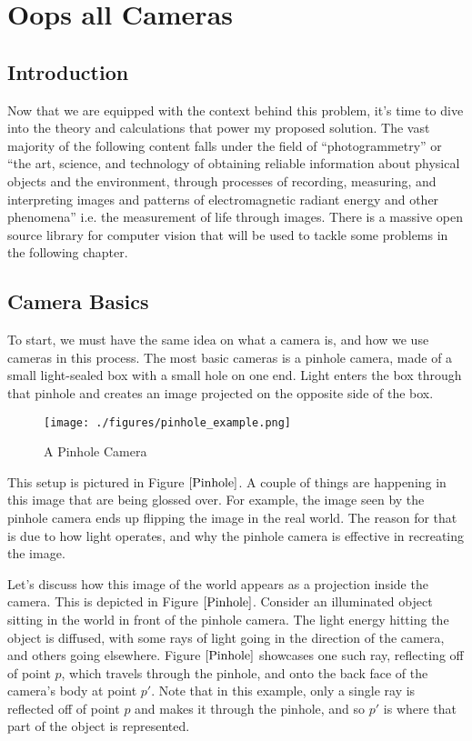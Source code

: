 \documentclass[
    12pt,
    twoside,
    bibstyle=chicago,
    headerstyle=uppercase,
	bibfile=thesis_updating.bib
]{reedthesis}
\begin{document}
\chapter{Oops all Cameras}


\section{Introduction}
	Now that we are equipped with the context behind this problem, it's time to dive into the theory and calculations that power my proposed solution. The vast majority of the following content falls under the field of “photogrammetry” or “the art, science, and technology of obtaining reliable information about physical objects and the environment, through processes of recording, measuring, and interpreting images and patterns of electromagnetic radiant energy and other phenomena” i.e. the measurement of life through images. There is a massive open source library for computer vision that will be used to tackle some problems in the following chapter. \autocite{pulliRealtimeComputerVision2012}
	
\section{Camera Basics}
To start, we must have the same idea on what a camera is, and how we use cameras in this process. The most basic cameras is a pinhole camera, made of a small light-sealed box with a small hole on one end. Light enters the box through that pinhole and creates an image projected on the opposite side of the box.

\begin{figure}[h]
	    \centering
	    \texttt{[image: ./figures/pinhole\_example.png]}
	    \caption{A Pinhole Camera}
	\label{Pinhole}
	\end{figure}

This setup is pictured in Figure $\ref{Pinhole}$. A couple of things are happening in this image that are being glossed over. For example, the image seen by the pinhole camera ends up flipping the image in the real world. The reason for that is due to how light operates, and why the pinhole camera is effective in recreating the image.

Let's discuss how this image of the world appears as a projection inside the camera. This is depicted in Figure $\ref{Pinhole}$. Consider an illuminated object sitting in the world in front of the pinhole camera. The light energy hitting the object is diffused, with some rays of light going in the direction of the camera, and others going elsewhere. Figure $\ref{Pinhole}$ showcases one such ray, reflecting off of point $p$, which travels through the pinhole, and onto the back face of the camera's body at point $p'$. Note that in this example, only a single ray is reflected off of point $p$ and makes it through the pinhole, and so $p'$ is where that part of the object is represented.
\end{document}
